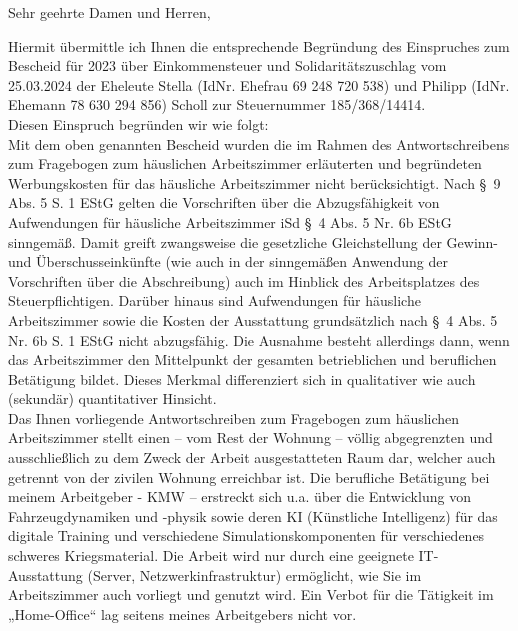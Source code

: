 \documentclass[
  fontsize=11pt,
  paper=a4,
  parskip=half,
  enlargefirstpage=on,    %
  fromalign=right,        %
  fromphone=on,           %
  fromrule=aftername,     %
  addrfield=off,           %
  backaddress=off,         %
  subject=beforeopening,  %
  locfield=narrow,        %
  foldmarks=on,           %
]{scrlttr2}
\begin{document}
\begin{letter}{}
  \opening{Sehr geehrte Damen und Herren,}

  Hiermit übermittle ich Ihnen die entsprechende Begründung des Einspruches zum Bescheid für 2023 über Einkommensteuer und Solidaritätszuschlag vom 25.03.2024 der Eheleute Stella (IdNr. Ehefrau 69 248 720 538) und Philipp (IdNr. Ehemann 78 630 294 856) Scholl zur Steuernummer 185/368/14414.\\%

  Diesen Einspruch begründen wir wie folgt:\\%

  Mit dem oben genannten Bescheid wurden die im Rahmen des Antwortschreibens zum Fragebogen zum häuslichen Arbeitszimmer erläuterten und begründeten Werbungskosten für das häusliche Arbeitszimmer nicht berücksichtigt. Nach §~9 Abs. 5 S. 1 EStG gelten die Vorschriften über die Abzugsfähigkeit von Aufwendungen für häusliche Arbeitszimmer iSd §~4 Abs. 5 Nr. 6b EStG sinngemäß. Damit greift zwangsweise die gesetzliche Gleichstellung der Gewinn- und Überschusseinkünfte (wie auch in der sinngemäßen Anwendung der Vorschriften über die Abschreibung) auch im Hinblick des Arbeitsplatzes des Steuerpflichtigen. Darüber hinaus sind Aufwendungen für häusliche Arbeitszimmer sowie die Kosten der Ausstattung grundsätzlich nach §~4 Abs. 5 Nr. 6b S. 1 EStG nicht abzugsfähig. Die Ausnahme besteht allerdings dann, wenn das Arbeitszimmer den Mittelpunkt der gesamten betrieblichen und beruflichen Betätigung bildet. Dieses Merkmal differenziert sich in qualitativer wie auch (sekundär) quantitativer Hinsicht.\\[0.5cm]%
  Das Ihnen vorliegende Antwortschreiben zum Fragebogen zum häuslichen Arbeitszimmer stellt einen – vom Rest der Wohnung – völlig abgegrenzten und ausschließlich zu dem Zweck der Arbeit ausgestatteten Raum dar, welcher auch getrennt von der zivilen Wohnung erreichbar ist. Die berufliche Betätigung bei meinem Arbeitgeber - KMW – erstreckt sich u.a. über die Entwicklung von Fahrzeugdynamiken und -physik sowie deren KI (Künstliche Intelligenz) für das digitale Training und verschiedene Simulationskomponenten für verschiedenes schweres Kriegsmaterial. Die Arbeit wird nur durch eine geeignete IT-Ausstattung (Server, Netzwerkinfrastruktur) ermöglicht, wie Sie im Arbeitszimmer auch vorliegt und genutzt wird. Ein Verbot für die Tätigkeit im „Home-Office“ lag seitens meines Arbeitgebers nicht vor.\\[0.5cm]%

\end{letter}
\end{document}
